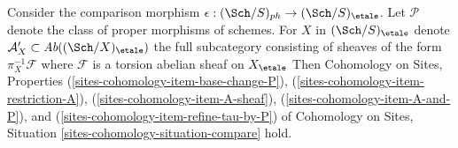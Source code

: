\begin{lemma}
\label{lemma-compare-ph-etale}
Consider the comparison morphism
$\epsilon : (\Sch/S)_{ph} \to (\Sch/S)_\etale$.
Let $\mathcal{P}$ denote the class of proper morphisms of schemes.
For $X$ in $(\Sch/S)_\etale$ denote
$\mathcal{A}'_X \subset \textit{Ab}((\Sch/X)_\etale)$
the full subcategory consisting of sheaves of the form
$\pi_X^{-1}\mathcal{F}$ where $\mathcal{F}$ is a
torsion abelian sheaf on $X_\etale$
Then Cohomology on Sites, Properties
(\ref{sites-cohomology-item-base-change-P}),
(\ref{sites-cohomology-item-restriction-A}),
(\ref{sites-cohomology-item-A-sheaf}),
(\ref{sites-cohomology-item-A-and-P}), and
(\ref{sites-cohomology-item-refine-tau-by-P})
of Cohomology on Sites, Situation
\ref{sites-cohomology-situation-compare} hold.
\end{lemma}

